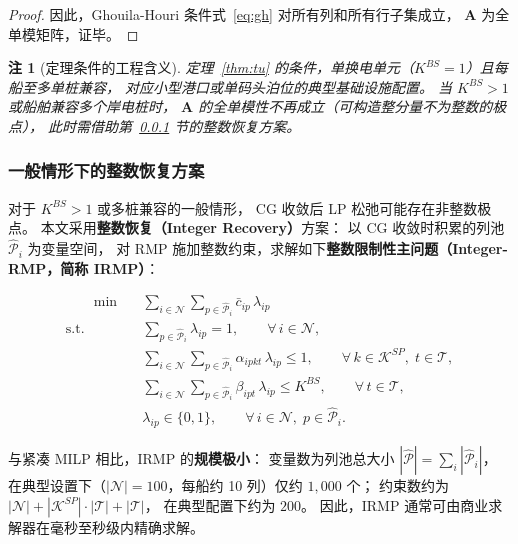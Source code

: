\documentclass[UTF8, a4paper, 12pt]{ctexart}
\newtheorem{remark}{注}
\begin{document}
\begin{proof}
因此，Ghouila-Houri 条件式~\eqref{eq:gh} 对所有列和所有行子集成立，
$\mathbf{A}$ 为全单模矩阵，证毕。
\end{proof}

\begin{remark}[定理条件的工程含义]
定理~\ref{thm:tu} 的条件，单换电单元（$K^{BS}=1$）且每船至多单桩兼容，
对应小型港口或单码头泊位的典型基础设施配置。
当 $K^{BS}>1$ 或船舶兼容多个岸电桩时，
$\mathbf{A}$ 的全单模性不再成立（可构造整分量不为整数的极点），
此时需借助第~\ref{sec:cg_ir} 节的整数恢复方案。
\end{remark}

\subsubsection{一般情形下的整数恢复方案}
\label{sec:cg_ir}

对于 $K^{BS}>1$ 或多桩兼容的一般情形，
CG 收敛后 LP 松弛可能存在非整数极点。
本文采用\textbf{整数恢复（Integer Recovery）}方案：
以 CG 收敛时积累的列池 $\hat{\mathcal{P}}_i$ 为变量空间，
对 RMP 施加整数约束，求解如下\textbf{整数限制性主问题（Integer-RMP，简称 IRMP）}：

\begin{align}
  [\text{IRMP}] \qquad
  \min \quad & \sum_{i \in \mathcal{N}} \sum_{p \in \hat{\mathcal{P}}_i}
    \bar{c}_{ip}\, \lambda_{ip}
  \label{eq:irmp_obj} \\
  \text{s.t.} \quad
  & \sum_{p \in \hat{\mathcal{P}}_i} \lambda_{ip} = 1,
    \qquad \forall\, i \in \mathcal{N},
  \label{eq:irmp_convex} \\
  & \sum_{i \in \mathcal{N}} \sum_{p \in \hat{\mathcal{P}}_i}
    \alpha_{ipkt}\, \lambda_{ip} \le 1,
    \qquad \forall\, k \in \mathcal{K}^{SP},\; t \in \mathcal{T},
  \label{eq:irmp_sp} \\
  & \sum_{i \in \mathcal{N}} \sum_{p \in \hat{\mathcal{P}}_i}
    \beta_{ipt}\, \lambda_{ip} \le K^{BS},
    \qquad \forall\, t \in \mathcal{T},
  \label{eq:irmp_bs} \\
  & \lambda_{ip} \in \{0,1\},
    \qquad \forall\, i \in \mathcal{N},\; p \in \hat{\mathcal{P}}_i.
  \label{eq:irmp_int}
\end{align}

与紧凑 MILP 相比，IRMP 的\textbf{规模极小}：
变量数为列池总大小 $|\hat{\mathcal{P}}|=\sum_i|\hat{\mathcal{P}}_i|$，
在典型设置下（$|\mathcal{N}|=100$，每船约 10 列）仅约 $1{,}000$ 个；
约束数约为 $|\mathcal{N}|+|\mathcal{K}^{SP}|\cdot|\mathcal{T}|+|\mathcal{T}|$，
在典型配置下约为 $200$。
因此，IRMP 通常可由商业求解器在毫秒至秒级内精确求解。
\end{document}
